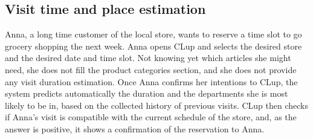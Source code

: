 \documentclass[../../main.tex]{subfiles}
\begin{document}
    \subsection*{Visit time and place estimation}

    Anna, a long time customer of the local store, wants to reserve a time slot to go grocery shopping the next week. 
    Anna opens CLup and selects the desired store and the desired date and time slot. 
    Not knowing yet which articles she might need, she does not fill the product categories section, 
    and she does not provide any visit duration estimation. Once Anna confirms her intentions to CLup, 
    the system predicts automatically the duration and the departments she is most likely to be in, 
    based on the collected history of previous visits. CLup then checks if Anna's visit is compatible with the 
    current schedule of the store, and, as the answer is positive, it shows a confirmation of the reservation to Anna.
\end{document}
